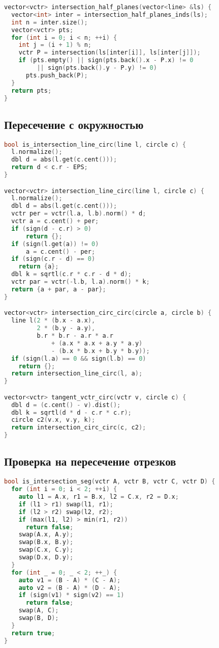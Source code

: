 \documentclass[10pt,a4paper,landscape,twosided]{extarticle}
\begin{document}
\begin{multicols*}{3}
\begin{lstlisting}[language=C++]
vector<vctr> intersection_half_planes(vector<line> &ls) {
  vector<int> inter = intersection_half_planes_inds(ls);
  int n = inter.size();
  vector<vctr> pts;
  for (int i = 0; i < n; ++i) {
    int j = (i + 1) % n;
    vctr P = intersection(ls[inter[i]], ls[inter[j]]);
    if (pts.empty() || sign(pts.back().x - P.x) != 0
         || sign(pts.back().y - P.y) != 0)
      pts.push_back(P);
  }
  return pts;
}

\end{lstlisting}

\subsection{Пересечение с окружностью}
\begin{lstlisting}[language=C++]
bool is_intersection_line_circ(line l, circle c) {
  l.normalize();
  dbl d = abs(l.get(c.cent()));
  return d < c.r - EPS;
}

vector<vctr> intersection_line_circ(line l, circle c) {
  l.normalize();
  dbl d = abs(l.get(c.cent()));
  vctr per = vctr(l.a, l.b).norm() * d;
  vctr a = c.cent() + per;
  if (sign(d - c.r) > 0)
      return {};
  if (sign(l.get(a)) != 0)
      a = c.cent() - per;
  if (sign(c.r - d) == 0)
    return {a};
  dbl k = sqrtl(c.r * c.r - d * d);
  vctr par = vctr(-l.b, l.a).norm() * k;
  return {a + par, a - par};
}

vector<vctr> intersection_circ_circ(circle a, circle b) {
  line l(2 * (b.x - a.x),
         2 * (b.y - a.y),
         b.r * b.r - a.r * a.r
             + (a.x * a.x + a.y * a.y)
             - (b.x * b.x + b.y * b.y));
  if (sign(l.a) == 0 && sign(l.b) == 0)
    return {};
  return intersection_line_circ(l, a);
}

vector<vctr> tangent_vctr_circ(vctr v, circle c) {
  dbl d = (c.cent() - v).dist();
  dbl k = sqrtl(d * d - c.r * c.r);
  circle c2(v.x, v.y, k);
  return intersection_circ_circ(c, c2);
}

\end{lstlisting}

\subsection{Проверка на пересечение отрезков}
\begin{lstlisting}[language=C++]
bool is_intersection_seg(vctr A, vctr B, vctr C, vctr D) {
  for (int i = 0; i < 2; ++i) {
    auto l1 = A.x, r1 = B.x, l2 = C.x, r2 = D.x;
    if (l1 > r1) swap(l1, r1);
    if (l2 > r2) swap(l2, r2);
    if (max(l1, l2) > min(r1, r2))
      return false;
    swap(A.x, A.y);
    swap(B.x, B.y);
    swap(C.x, C.y);
    swap(D.x, D.y);
  }
  for (int _ = 0; _ < 2; ++_) {
    auto v1 = (B - A) * (C - A);
    auto v2 = (B - A) * (D - A);
    if (sign(v1) * sign(v2) == 1)
      return false;
    swap(A, C);
    swap(B, D);
  }
  return true;
}


\end{lstlisting}
\end{multicols*}
\end{document}
